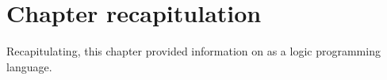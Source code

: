 \documentclass[thesis-solanki.tex]{subfiles}
\begin{document}
\section{Chapter recapitulation}
Recapitulating, this chapter provided information on  as a logic programming language.

\ifMain
\begin{scope}
  \nolinenumbers
  \enotesize
  \par
  \begin{singlespace}
  \setlength{\parskip}{12pt plus 2pt minus 1pt}
  \theendnotes
  \par
  \end{singlespace}
\end{scope}
\fi
\end{document}
